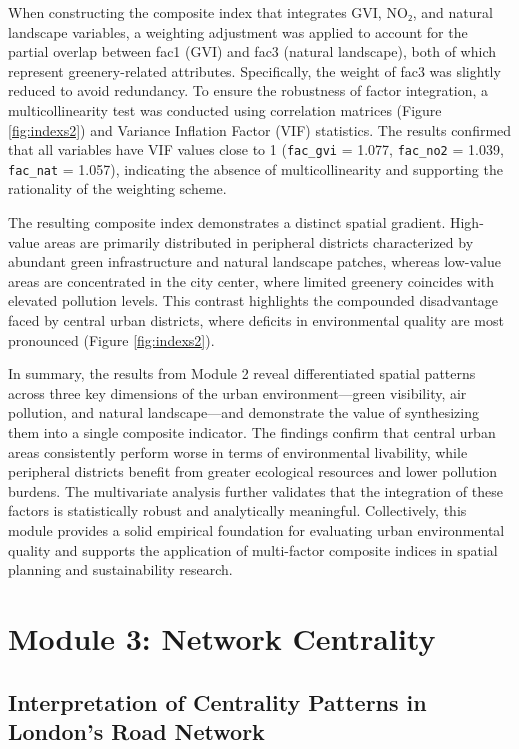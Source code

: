 \documentclass[
  12pt,
  oneside]{book}
\begin{document}
When constructing the composite index that integrates GVI, NO₂, and natural landscape variables, a weighting adjustment was applied to account for the partial overlap between fac1 (GVI) and fac3 (natural landscape), both of which represent greenery-related attributes. Specifically, the weight of fac3 was slightly reduced to avoid redundancy. To ensure the robustness of factor integration, a multicollinearity test was conducted using correlation matrices (Figure \ref{fig:indexs2}) and Variance Inflation Factor (VIF) statistics. The results confirmed that all variables have VIF values close to 1 (\texttt{fac\_gvi} = 1.077, \texttt{fac\_no2} = 1.039, \texttt{fac\_nat} = 1.057), indicating the absence of multicollinearity and supporting the rationality of the weighting scheme.

The resulting composite index demonstrates a distinct spatial gradient. High-value areas are primarily distributed in peripheral districts characterized by abundant green infrastructure and natural landscape patches, whereas low-value areas are concentrated in the city center, where limited greenery coincides with elevated pollution levels. This contrast highlights the compounded disadvantage faced by central urban districts, where deficits in environmental quality are most pronounced (Figure \ref{fig:indexs2}).

In summary, the results from Module 2 reveal differentiated spatial patterns across three key dimensions of the urban environment---green visibility, air pollution, and natural landscape---and demonstrate the value of synthesizing them into a single composite indicator. The findings confirm that central urban areas consistently perform worse in terms of environmental livability, while peripheral districts benefit from greater ecological resources and lower pollution burdens. The multivariate analysis further validates that the integration of these factors is statistically robust and analytically meaningful. Collectively, this module provides a solid empirical foundation for evaluating urban environmental quality and supports the application of multi-factor composite indices in spatial planning and sustainability research.

\section{Module 3: Network Centrality}\label{module-3-network-centrality}

\subsection{Interpretation of Centrality Patterns in London's Road Network}\label{interpretation-of-centrality-patterns-in-londons-road-network}
\end{document}
